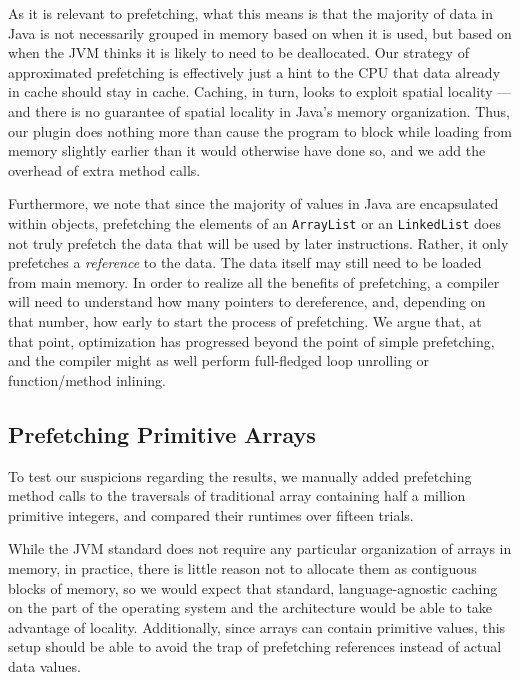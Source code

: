 \documentclass[journal]{IEEEtran}
\begin{document}
As it is relevant to prefetching, what this means is that the majority of data in Java is not necessarily grouped in memory based on when it is used, but based on when the JVM thinks it is likely to need to be deallocated. Our strategy of approximated prefetching is effectively just a hint to the CPU that data already in cache should stay in cache. Caching, in turn, looks to exploit spatial locality --- and there is no guarantee of spatial locality in Java's memory organization. Thus, our plugin does nothing more than cause the program to block while loading from memory slightly earlier than it would otherwise have done so, and we add the overhead of extra method calls.

Furthermore, we note that since the majority of values in Java are encapsulated within objects, prefetching the elements of an \texttt{ArrayList} or an \texttt{LinkedList} does not truly prefetch the data that will be used by later instructions. Rather, it only prefetches a \textit{reference} to the data. The data itself may still need to be loaded from main memory. In order to realize all the benefits of prefetching, a compiler will need to understand how many pointers to dereference, and, depending on that number, how early to start the process of prefetching. We argue that, at that point, optimization has progressed beyond the point of simple prefetching, and the compiler might as well perform full-fledged loop unrolling or function/method inlining.

\subsection{Prefetching Primitive Arrays}

To test our suspicions regarding the results, we manually added prefetching method calls to the traversals of traditional array containing half a million primitive integers, and compared their runtimes over fifteen trials.

While the JVM standard does not require any particular organization of arrays in memory, in practice, there is little reason not to allocate them as contiguous blocks of memory, so we would expect that standard, language-agnostic caching on the part of the operating system and the architecture would be able to take advantage of locality. Additionally, since arrays can contain primitive values, this setup should be able to avoid the trap of prefetching references instead of actual data values.
\end{document}
